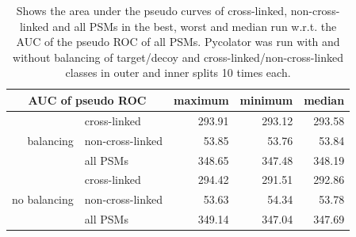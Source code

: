 \begin{table}[htbp]
	\normalsize
	\centering	
	\caption[Area under the pseudo ROC curves with and without balancing of classes]{Shows the area under the pseudo curves of cross-linked, non-cross-linked and all PSMs in the best, worst and median run w.r.t. the AUC of the pseudo ROC of all PSMs. Pycolator was run with and without balancing of target/decoy and cross-linked/non-cross-linked classes in outer and inner splits 10 times each.}
	\begin{tabular}{r|l||rrr}
		\multicolumn{2}{c}{AUC of pseudo ROC} & maximum & minimum & median \\
		\hline
		\multirow{3}[0]{*}{balancing} & cross-linked & 293.91 & 293.12 & 293.58 \\
		& non-cross-linked & 53.85 & 53.76 & 53.84 \\
		& all PSMs & 348.65 & 347.48 & 348.19 \\
		\hline
		\multirow{3}[0]{*}{no balancing} & cross-linked & 294.42 & 291.51 & 292.86 \\
		& non-cross-linked & 53.63 & 54.34 & 53.78 \\
		& all PSMs & 349.14 & 347.04 & 347.69 \\
	\end{tabular}
	\label{tab:results:maxminmedian}
\end{table}
\renewcommand{\baselinestretch}{1}

